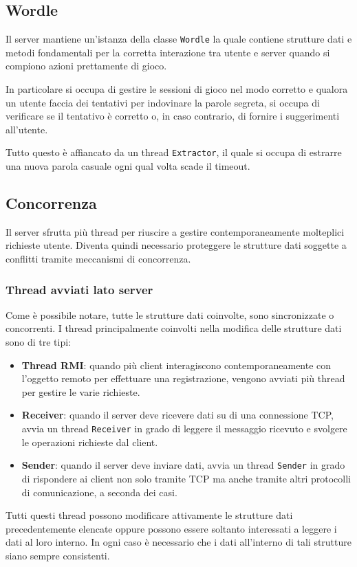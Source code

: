 \subsection{Wordle}
Il server mantiene un'istanza della classe \verb|Wordle| la quale contiene strutture dati e metodi
fondamentali per la corretta interazione tra utente e server quando si compiono azioni prettamente
di gioco.

In particolare si occupa di gestire le sessioni di gioco nel modo corretto e qualora un utente
faccia dei tentativi per indovinare la parole segreta, si occupa di verificare se il tentativo è
corretto o, in caso contrario, di fornire i suggerimenti all'utente.

Tutto questo è affiancato da un thread \verb|Extractor|, il quale si occupa di estrarre una nuova
parola casuale ogni qual volta scade il timeout.

\subsection{Concorrenza}
Il server sfrutta più thread per riuscire a gestire contemporaneamente molteplici richieste utente.
Diventa quindi necessario proteggere le strutture dati soggette a conflitti tramite meccanismi di
concorrenza.

\subsubsection{Thread avviati lato server}
Come è possibile notare, tutte le strutture dati coinvolte, sono sincronizzate o concorrenti. I
thread principalmente coinvolti nella modifica delle strutture dati sono di tre tipi:
\begin{itemize}
	\item \textbf{Thread RMI}: quando più client interagiscono contemporaneamente con l'oggetto
	      remoto per effettuare una registrazione, vengono avviati più thread per gestire le varie
	      richieste.
	\item \textbf{Receiver}: quando il server deve ricevere dati su di una connessione TCP,
	      avvia un thread \verb|Receiver| in grado di leggere il messaggio ricevuto e svolgere le
	      operazioni richieste dal client.
	\item \textbf{Sender}: quando il server deve inviare dati, avvia un thread \verb|Sender| in
	      grado di rispondere ai client non solo tramite TCP ma anche tramite altri protocolli di
	      comunicazione, a seconda dei casi.
\end{itemize}
Tutti questi thread possono modificare attivamente le strutture dati precedentemente elencate
oppure possono essere soltanto interessati a leggere i dati al loro interno. In ogni caso è
necessario che i dati all'interno di tali strutture siano sempre consistenti.

